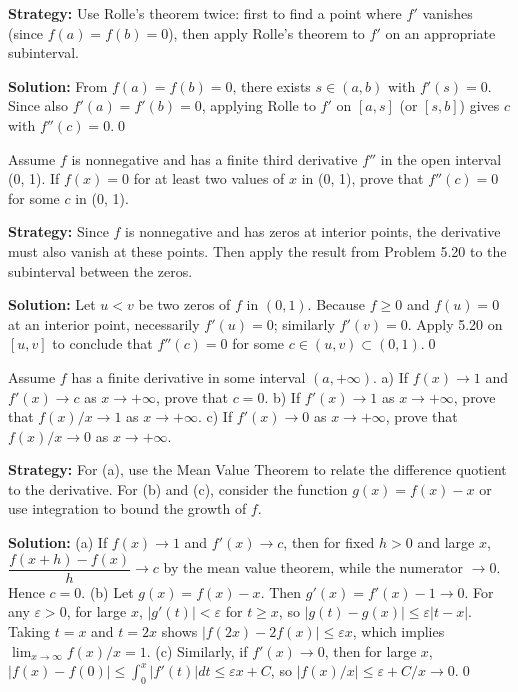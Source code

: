 \noindent\textbf{Strategy:} Use Rolle's theorem twice: first to find a point where \( f' \) vanishes (since \( f(a) = f(b) = 0 \)), then apply Rolle's theorem to \( f' \) on an appropriate subinterval.

\bigskip\noindent\textbf{Solution:}
From $f(a)=f(b)=0$, there exists $s\in(a,b)$ with $f'(s)=0$. Since also $f'(a)=f'(b)=0$, applying Rolle to $f'$ on $[a,s]$ (or $[s,b]$) gives $c$ with $f''(c)=0$.\qed


\begin{problembox}
\begin{problemstatement}
Assume \( f \) is nonnegative and has a finite third derivative \( f'' \) in the open interval (0, 1). If \( f(x) = 0 \) for at least two values of \( x \) in (0, 1), prove that \( f''(c) = 0 \) for some \( c \) in (0, 1).
\end{problemstatement}
\end{problembox}

\noindent\textbf{Strategy:} Since \( f \) is nonnegative and has zeros at interior points, the derivative must also vanish at these points. Then apply the result from Problem 5.20 to the subinterval between the zeros.

\bigskip\noindent\textbf{Solution:}
Let $u<v$ be two zeros of $f$ in $(0,1)$. Because $f\ge 0$ and $f(u)=0$ at an interior point, necessarily $f'(u)=0$; similarly $f'(v)=0$. Apply 5.20 on $[u,v]$ to conclude that $f''(c)=0$ for some $c\in(u,v)\subset(0,1)$.\qed


\begin{problembox}
\begin{problemstatement}
Assume \( f \) has a finite derivative in some interval \( (a, +\infty) \).
a) If \( f(x) \to 1 \) and \( f'(x) \to c \) as \( x \to +\infty \), prove that \( c = 0 \).
b) If \( f'(x) \to 1 \) as \( x \to +\infty \), prove that \( f(x)/x \to 1 \) as \( x \to +\infty \).
c) If \( f'(x) \to 0 \) as \( x \to +\infty \), prove that \( f(x)/x \to 0 \) as \( x \to +\infty \).
\end{problemstatement}
\end{problembox}

\noindent\textbf{Strategy:} For (a), use the Mean Value Theorem to relate the difference quotient to the derivative. For (b) and (c), consider the function \( g(x) = f(x) - x \) or use integration to bound the growth of \( f \).

\bigskip\noindent\textbf{Solution:}
(a) If $f(x)\to 1$ and $f'(x)\to c$, then for fixed $h>0$ and large $x$, $\dfrac{f(x+h)-f(x)}{h}\to c$ by the mean value theorem, while the numerator $\to 0$. Hence $c=0$. (b) Let $g(x)=f(x)-x$. Then $g'(x)=f'(x)-1\to 0$. For any $\varepsilon>0$, for large $x$, $|g'(t)|<\varepsilon$ for $t\ge x$, so $|g(t)-g(x)|\le \varepsilon|t-x|$. Taking $t=x$ and $t=2x$ shows $|f(2x)-2f(x)|\le \varepsilon x$, which implies $\lim_{x\to\infty}f(x)/x=1$. (c) Similarly, if $f'(x)\to 0$, then for large $x$, $|f(x)-f(0)|\le \int_0^x|f'(t)|dt\le \varepsilon x+C$, so $|f(x)/x|\le \varepsilon+C/x\to 0$.\qed


